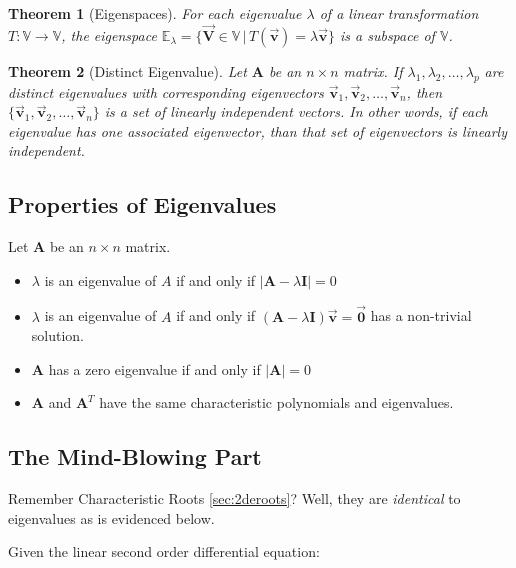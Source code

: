 \documentclass[12pt,landscape,twocolumn]{article}
\newcommand{\ma}[0]{\mathbf{A} }        %
\let\oldvec\vec
\renewcommand{\vec}[1]{\oldvec{\mathbf{ #1 } } }                    %
\newtheorem{thm}{Theorem}
\begin{document}
        \begin{thm}[Eigenspaces]
            For each eigenvalue $\lambda$ of a linear transformation $T: \mathbb{V} \to \mathbb{V}$, the eigenspace
            $
                \mathbb{E}_{\lambda} = \{ \vec{V} \in \mathbb{V} \, | \, T(\vec{v}) = \lambda \vec{v} \}
            $
            is a subspace of $\mathbb{V}$.
        \end{thm}

        \begin{thm}[Distinct Eigenvalue]
            Let $\ma$ be an $n \times n$ matrix. If $\lambda_1, \lambda_2, \dots, \lambda_p$ are distinct eigenvalues with corresponding eigenvectors $\vec{v}_1, \vec{v}_2, \dots, \vec{v}_n$, then $\{\vec{v}_1, \vec{v}_2, \dots, \vec{v}_n\}$ is a set of linearly independent vectors.
            In other words, if each eigenvalue has one associated eigenvector, than that set of eigenvectors is linearly independent.
        \end{thm}

    \subsection{Properties of Eigenvalues}
    Let $\ma$ be an $n \times n$ matrix.

        \begin{itemize}
            \item $\lambda$ is an eigenvalue of $A$ if and only if
                $ | \ma - \lambda \mathbf{I} | = 0 $
            \item $\lambda$ is an eigenvalue of $A$ if and only if
                $ ( \ma - \lambda \mathbf{I}) \vec{v} = \vec{0} $
                has a non-trivial solution.
            \item $\ma$ has a zero eigenvalue if and only if
                $ | \ma | = 0 $
            \item $\ma$ and $\ma^T$ have the same characteristic polynomials and eigenvalues.
        \end{itemize}

    \subsection{The Mind-Blowing Part}
    Remember Characteristic Roots \eqref{sec:2deroots}? Well, they are \textit{identical} to eigenvalues as is evidenced below.

     Given the linear second order differential equation:
\end{document}
